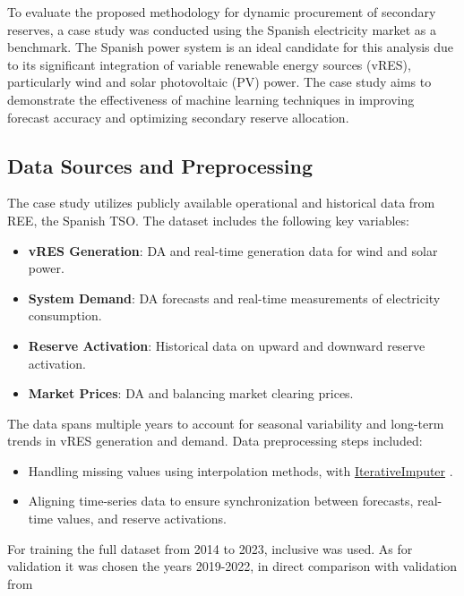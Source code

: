 To evaluate the proposed methodology for dynamic procurement of secondary reserves, a case study was conducted using the Spanish electricity market as a benchmark. The Spanish power system is an ideal candidate for this analysis due to its significant integration of variable renewable energy sources (vRES), particularly wind and solar photovoltaic (PV) power. The case study aims to demonstrate the effectiveness of machine learning techniques in improving forecast accuracy and optimizing secondary reserve allocation.\par
\subsection{Data Sources and Preprocessing}

The case study utilizes publicly available operational and historical data from \gls{REE}, the Spanish \gls{TSO}. The dataset includes the following key variables:
\begin{itemize}
    \item \textbf{vRES Generation}: \gls{DA} and real-time generation data for wind and solar power.
    \item \textbf{System Demand}: \gls{DA} forecasts and real-time measurements of electricity consumption.
    \item \textbf{Reserve Activation}: Historical data on upward and downward reserve activation.
    \item \textbf{Market Prices}: \gls{DA} and balancing market clearing prices.
\end{itemize}




The data spans multiple years to account for seasonal variability and long-term trends in vRES generation and demand. Data preprocessing steps included:
\begin{itemize}
    \item Handling missing values using interpolation methods, with \href{https://scikit-learn.org/stable/modules/generated/sklearn.impute.IterativeImputer.html}{IterativeImputer} \cite{vanBuuren2011}\cite{Buck1960}.
    \item Aligning time-series data to ensure synchronization between forecasts, real-time values, and reserve activations.
\end{itemize}

For training the full dataset from 2014 to 2023, inclusive was used. As for validation it was chosen the years 2019-2022, in direct comparison with validation from \cite{Algarvio2024}


